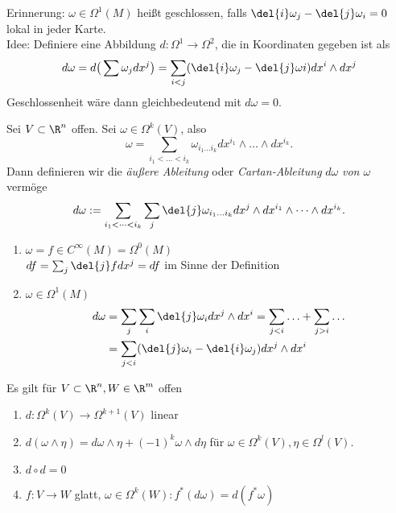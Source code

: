 Erinnerung: \lecture $ \omega \in \Omega^1(M) $ heißt geschlossen, falls $ \del{i}\omega_j - \del{j} \omega_i = 0 $ lokal in jeder Karte.\\
Idee: Definiere eine Abbildung $ d: \Omega^1 \to \Omega^2 $, die in Koordinaten gegeben ist als
\[ d\omega = d \big( \sum \omega_j dx^j \big) = \sum_{i < j} (\del{i} \omega_j - \del{j} \omega i) dx^i \wedge dx^j \]
Geschlossenheit wäre dann gleichbedeutend mit $d\omega = 0$.

\begin{defn}  \label{7.5}
	Sei $ V \subset \R^n $ offen. Sei $ \omega \in \Omega^k(V) $, also 
	\[ \omega = \sum_{i_1 < \dots < i_k} \omega_{i_1 \dots i_k} dx^{i_1} \wedge \dots \wedge dx^{i_k}. \]
	Dann definieren wir die \emph{äußere Ableitung} oder \emph{Cartan-Ableitung} $d\omega$ \emph{von $\omega$} vermöge
	\[ d\omega := \sum_{i_1 < \dots < i_k} \sum_j \del{j} \omega_{i_1 \dots i_k} dx^j \wedge dx^{i_1} \wedge \dots \wedge dx^{i_k}. \]
\end{defn}

\begin{rem*}
	\begin{enumerate}[label={\roman*})]
		\item $ \omega = f \in C^\infty(M) = \Omega^0(M) $\\
			$ df = \sum_j \del{j} f dx^j = df $ im Sinne der Definition
		\item $ \omega \in \Omega^1(M) $
			\begin{align*}
				d\omega &= \sum_j \sum_i \del{j}\omega_i dx^j \wedge dx^i = \sum_{j<i} \dotsc + \sum_{j > i} \dots\\
				&= \sum_{j<i} (\del{j} \omega_i - \del{i}\omega_j) dx^j \wedge dx^i
			\end{align*}
	\end{enumerate}
\end{rem*}

\begin{lem}
	Es gilt für $ V \subset \R^n, W \in \R^m $ offen
	\begin{enumerate}[label={\roman*})]
		\item $ d: \Omega^k(V) \to \Omega^{k+1}(V) $ linear
		\item $ d(\omega \wedge \eta) = d\omega \wedge \eta + (-1)^k \omega \wedge d\eta $ für $ \omega \in \Omega^k(V), \eta \in \Omega^l(V). $
		\item $d \circ d = 0$
		\item $ f: V \to W $ glatt, $\omega \in \Omega^k(W): f^*(d\omega) = d(f^*\omega)$
	\end{enumerate}
\end{lem}


